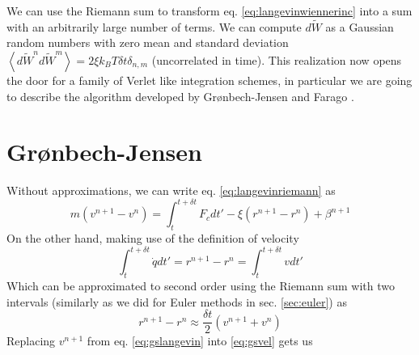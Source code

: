 \documentclass[ twoside,openright,titlepage,numbers=noenddot,%
headinclude,footinclude,cleardoublepage=empty,abstract=on,
BCOR=5mm,paper=a4,fontsize=11pt, dvipsnames
]{scrreprt}
\newcommand{\dt}{\delta t}
\newcommand{\kT}{k_B T}
\newcommand{\noise}{\widetilde{W}}
\newcommand{\ppos}{q}
\begin{document}
We can use the Riemann sum to transform eq. \eqref{eq:langevinwiennerinc} into a sum with an arbitrarily large number of terms. We can compute $d\noise$ as a Gaussian random numbers with zero mean and standard deviation $\left\langle d\noise^nd\noise^m\right\rangle = 2\xi\kT\dt\delta_{n,m}$ (uncorrelated in time).
This realization now opens the door for a family of Verlet like integration schemes, in particular we are going to describe the algorithm developed by Grønbech-Jensen and Farago \cite{Gronbech2013}.

\section{Grønbech-Jensen}\label{sec:gronbechjensen}
Without approximations, we can write eq. \eqref{eq:langevinriemann} as
\begin{equation}
  \label{eq:gslangevin}
  m\left(v^{n+1}-v^n\right) = \int_t^{t+\dt}F_c dt' - \xi\left(r^{n+1}-r^n\right) + \beta^{n+1}
\end{equation}
On the other hand, making use of the definition of velocity
\begin{equation}
  \int_t^{t+\dt}\dot{\ppos}dt' = r^{n+1} - r^n = \int_t^{t+\dt}vdt'
\end{equation}
Which can be approximated to second order using the Riemann sum with two intervals (similarly as we did for Euler methods in sec. \ref{sec:euler}) as
\begin{equation}
  \label{eq:gsvel}
  r^{n+1} - r^n \approx \frac{\dt}{2}\left(v^{n+1}+v^n\right)
\end{equation}
Replacing $v^{n+1}$ from eq. \eqref{eq:gslangevin} into \eqref{eq:gsvel} gets us
\end{document}
